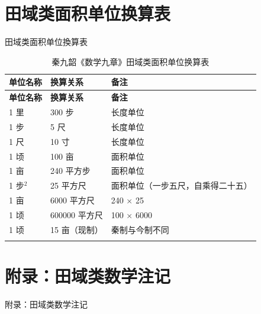 \documentclass[11pt,a4paper]{article}
\newcommand{\modtext}[1]{{\color{modcolor}#1}}
\begin{document}
\newpage

\section*{\color{origcolor}田域类面积单位换算表}
\vspace{-0.3em}
{\normalsize\color{modcolor} 田域类面积单位換算表}

\begin{center}
\begin{longtable}{|l|l|l|}
\hline
\textbf{\color{origcolor}单位名称} & \textbf{\color{origcolor}换算关系} & \textbf{\color{origcolor}备注} \\
\hline
\endfirsthead
\hline
\textbf{\color{origcolor}单位名称} & \textbf{\color{origcolor}换算关系} & \textbf{\color{origcolor}备注} \\
\hline
\endhead
1 里 & 300 步 & \modtext{长度单位} \\
\hline
1 步 & 5 尺 & \modtext{长度单位} \\
\hline
1 尺 & 10 寸 & \modtext{长度单位} \\
\hline
1 顷 & 100 亩 & \modtext{面积单位} \\
\hline
1 亩 & 240 平方步 & \modtext{面积单位} \\
\hline
1 步$^2$ & 25 平方尺 & \modtext{面积单位（一步五尺，自乘得二十五）} \\
\hline
1 亩 & 6000 平方尺 & 240 $\times$ 25 \\
\hline
1 顷 & 600000 平方尺 & 100 $\times$ 6000 \\
\hline
1 顷 & 15 亩（现制） & \modtext{秦制与今制不同} \\
\hline
\caption{\color{origcolor}秦九韶《数学九章》田域类面积单位换算表}
\end{longtable}
\end{center}

\newpage

\section*{\color{origcolor}附录：田域类数学注记}
\vspace{-0.3em}
{\normalsize\color{modcolor} 附录：田域类数学注记}
\end{document}
